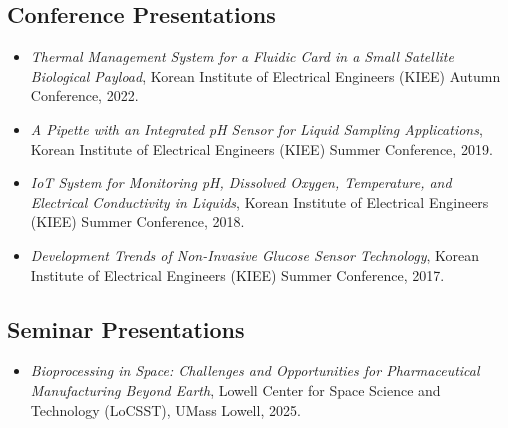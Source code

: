 \documentclass[letterpaper,11pt]{moderncv}
\begin{document}
\subsection{Conference Presentations}
\begin{sloppypar}
\begin{itemize}[leftmargin=1cm, itemsep=0pt, parsep=0pt]
    \item \textit{Thermal Management System for a Fluidic Card in a Small Satellite Biological Payload}, Korean Institute of Electrical Engineers (KIEE) Autumn Conference, 2022.
    \item \textit{A Pipette with an Integrated pH Sensor for Liquid Sampling Applications}, Korean Institute of Electrical Engineers (KIEE) Summer Conference, 2019.
    \item \textit{IoT System for Monitoring pH, Dissolved Oxygen, Temperature, and Electrical Conductivity in Liquids}, Korean Institute of Electrical Engineers (KIEE) Summer Conference, 2018.
    \item \textit{Development Trends of Non-Invasive Glucose Sensor Technology}, Korean Institute of Electrical Engineers (KIEE) Summer Conference, 2017.
\end{itemize}
\end{sloppypar}

\subsection{Seminar Presentations}
\begin{itemize}[leftmargin=1cm, itemsep=0pt, parsep=0pt]
    \item \textit{Bioprocessing in Space: Challenges and Opportunities for Pharmaceutical Manufacturing Beyond Earth}, Lowell Center for Space Science and Technology (LoCSST), UMass Lowell, 2025.
\end{itemize}

\vfill
{}
\end{document}
